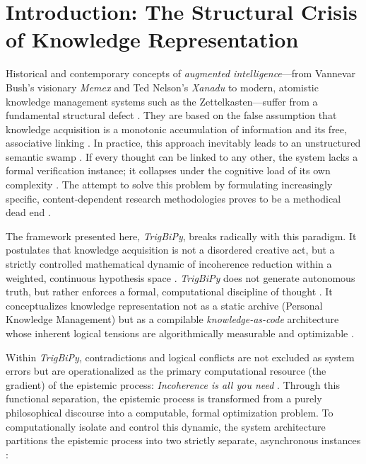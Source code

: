 \documentclass[11pt, a4paper]{article}
\begin{document}
	\section{Introduction: The Structural Crisis of Knowledge Representation}
	
	Historical and contemporary concepts of \emph{augmented intelligence}—from Vannevar Bush's visionary \emph{Memex} and Ted Nelson's \emph{Xanadu} to modern, atomistic knowledge management systems such as the Zettelkasten—suffer from a fundamental structural defect \cite{241}. They are based on the false assumption that knowledge acquisition is a monotonic accumulation of information and its free, associative linking \cite{241, 242, 390}. In practice, this approach inevitably leads to an unstructured semantic swamp \cite{242}. If every thought can be linked to any other, the system lacks a formal verification instance; it collapses under the cognitive load of its own complexity \cite{241, 242}. The attempt to solve this problem by formulating increasingly specific, content-dependent research methodologies proves to be a methodical dead end \cite{243}.
	
	The framework presented here, \emph{TrigBiPy}, breaks radically with this paradigm. It postulates that knowledge acquisition is not a disordered creative act, but a strictly controlled mathematical dynamic of incoherence reduction within a weighted, continuous hypothesis space \cite{235, 237, 244}. \emph{TrigBiPy} does not generate autonomous truth, but rather enforces a formal, computational discipline of thought \cite{245, 411}. It conceptualizes knowledge representation not as a static archive (Personal Knowledge Management) but as a compilable \emph{knowledge-as-code} architecture whose inherent logical tensions are algorithmically measurable and optimizable \cite{235, 238, 396, 428}. 
	
	Within \emph{TrigBiPy}, contradictions and logical conflicts are not excluded as system errors but are operationalized as the primary computational resource (the gradient) of the epistemic process: \emph{Incoherence is all you need} \cite{238, 397, 398, 441}. Through this functional separation, the epistemic process is transformed from a purely philosophical discourse into a computable, formal optimization problem. To computationally isolate and control this dynamic, the system architecture partitions the epistemic process into two strictly separate, asynchronous instances \cite{246}:
	
\end{document}
